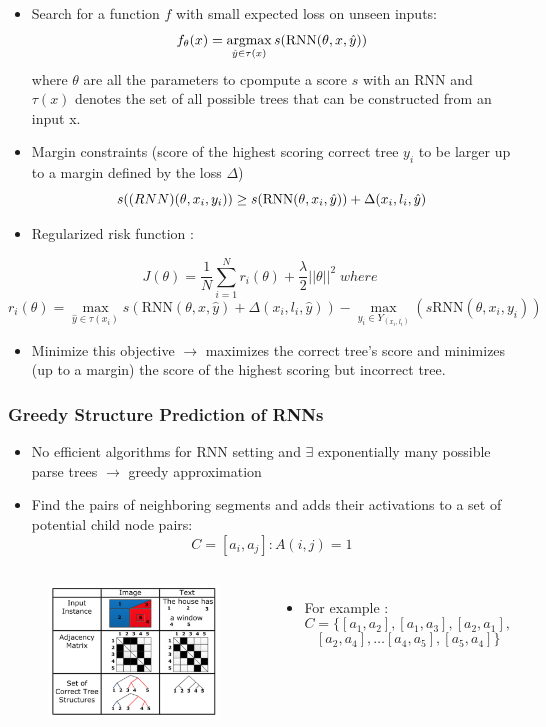 \documentclass{beamer}
\newcommand{\argmax}{\operatornamewithlimits{argmax}}
\begin{document}
\frame
{
	\begin{itemize}
		\item Search for a function $ f $ with small expected loss on unseen inputs:
		$$ f_{\theta}(x) = \argmax_{\hat{y}\in\tau(x)} s(\text{RNN}(\theta, x, \hat{y}))$$
		where $\theta$ are all the parameters to cpompute a score $ s $ with an RNN and $ \tau(x) $
		denotes the set of all possible trees that can be constructed from an input x. 
		\item Margin constraints (score of the highest scoring correct tree $y_i$ to be larger up to a margin defined by the loss $ \Delta $)
		$$ s(\text(RNN)(\theta, x_i, y_i)) \geq s(\text{RNN}(\theta, x_i, \hat{y})) + \Delta(x_i, l_i, \hat{y})$$
	\end{itemize}
}
\frame
{
	\begin{itemize}
		\item Regularized risk function :
	\end{itemize}
		$$ J(\theta) = \frac{1}{N}\sum_{i=1}^N r_i(\theta) + \frac{\lambda}{2}||\theta||^2 \; where$$
		$$ r_i(\theta) = \max_{\hat{y}\in\tau(x_i)} s(\text{RNN}(\theta, x, \hat{y}) + \Delta(x_i, l_i, \hat{y})) - 
		\max_{y_i \in Y_{(x_i, l_i)}} (s\text{RNN}(\theta, x_i, y_i)) $$

	\begin{itemize}
		\item Minimize this objective $\rightarrow$ maximizes the correct tree's score and minimizes (up to a margin) 
		the score of the highest scoring but incorrect tree. 
	\end{itemize}
}
\frame
{
	\frametitle{Greedy Structure Prediction of RNNs}
	\begin{itemize}
		\item No efficient algorithms for RNN setting and $\exists$ exponentially 
		many possible parse trees $\rightarrow$ greedy approximation
		\item Find the pairs of neighboring segments and adds their activations to a set of potential child node pairs:
		$$ C = {[a_i, a_j]: A(i,j) = 1} $$
	\end{itemize}
}
\frame
{
	\begin{columns}
	\begin{figure}[ht]  
		\begin{center}
			\includegraphics[width=2.1in]{images/fig3.png}   
		\end{center}   
	\end{figure}
	\begin{itemize}
		\item For example :
		$$ C = \{[a_1, a_2], [a_1, a_3], [a_2, a_1], $$ 
		$$ [a_2, a_4], \dots  [a_4,a_5], [a_5, a_4]\} $$
	\end{itemize}
	\end{columns}
}
\end{document}
